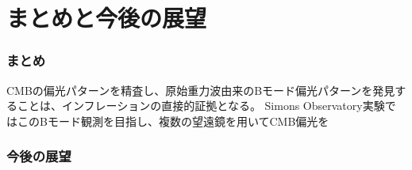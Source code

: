 \documentclass[../../main.tex]{subfiles}
\begin{document}
\chapter{まとめと今後の展望}
\subsection{まとめ}
CMBの偏光パターンを精査し、原始重力波由来のBモード偏光パターンを発見することは、インフレーションの直接的証拠となる。
Simons Observatory実験ではこのBモード観測を目指し、複数の望遠鏡を用いてCMB偏光を

\subsection{今後の展望}
\end{document}

